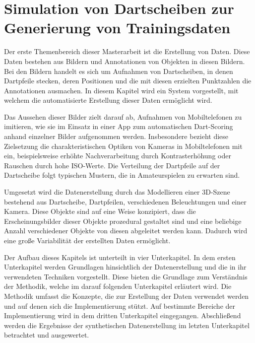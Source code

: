
\chapter{Simulation von Dartscheiben zur Generierung von Trainingsdaten}
\label{cha:daten}

Der erste Themenbereich dieser Masterarbeit ist die Erstellung von Daten. Diese Daten bestehen aus Bildern und Annotationen von Objekten in diesen Bildern. Bei den Bildern handelt es sich um Aufnahmen von Dartscheiben, in denen Dartpfeile stecken, deren Positionen und die mit diesen erzielten Punktzahlen die Annotationen ausmachen. In diesem Kapitel wird ein System vorgestellt, mit welchem die automatisierte Erstellung dieser Daten ermöglicht wird.

Das Aussehen dieser Bilder zielt darauf ab, Aufnahmen von Mobiltelefonen zu imitieren, wie sie im Einsatz in einer App zum automatischen Dart-Scoring anhand einzelner Bilder aufgenommen werden. Insbesondere bezieht diese Zielsetzung die charakteristischen Optiken von Kameras in Mobiltelefonen mit ein, beispielsweise erhöhte Nachverarbeitung durch Kontrasterhöhung oder Rauschen durch hohe ISO-Werte. Die Verteilung der Dartpfeile auf der Dartscheibe folgt typischen Mustern, die in Amateurspielen zu erwarten sind.

Umgesetzt wird die Datenerstellung durch das Modellieren einer 3D-Szene bestehend aus Dartscheibe, Dartpfeilen, verschiedenen Beleuchtungen und einer Kamera. Diese Objekte sind auf eine Weise konzipiert, dass die Erscheinungsbilder dieser Objekte prozedural gestaltet sind und eine beliebige Anzahl verschiedener Objekte von diesen abgeleitet werden kann. Dadurch wird eine große Variabilität der erstellten Daten ermöglicht.

Der Aufbau dieses Kapitels ist unterteilt in vier Unterkapitel. In dem ersten Unterkapitel werden Grundlagen hinsichtlich der Datenerstellung und die in ihr verwendeten Techniken vorgestellt. Diese bieten die Grundlage zum Verständnis der Methodik, welche im darauf folgenden Unterkapitel erläutert wird. Die Methodik umfasst die Konzepte, die zur Erstellung der Daten verwendet werden und auf denen sich die Implementierung stützt. Auf bestimmte Bereiche der Implementierung wird in dem dritten Unterkapitel eingegangen. Abschließend werden die Ergebnisse der synthetischen Datenerstellung im letzten Unterkapitel betrachtet und ausgewertet.





